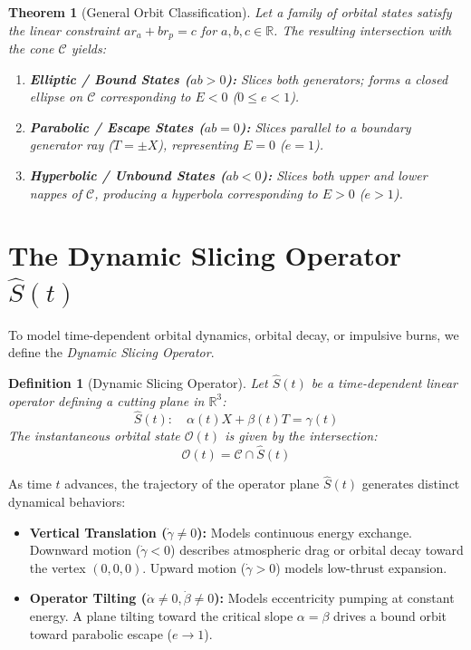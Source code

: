 \documentclass[11pt,3p,twocolumn]{elsarticle}
\newtheorem{theorem}{Theorem}
\newtheorem{definition}{Definition}
\begin{document}
\begin{theorem}[General Orbit Classification]
Let a family of orbital states satisfy the linear constraint $a r_a + b r_p = c$ for $a, b, c \in \mathbb{R}$. The resulting intersection with the cone $\mathcal{C}$ yields:
\begin{enumerate}
    \item \textbf{Elliptic / Bound States ($ab > 0$):} Slices both generators; forms a closed ellipse on $\mathcal{C}$ corresponding to $E < 0$ ($0 \le e < 1$).
    \item \textbf{Parabolic / Escape States ($ab = 0$):} Slices parallel to a boundary generator ray ($T = \pm X$), representing $E = 0$ ($e = 1$).
    \item \textbf{Hyperbolic / Unbound States ($ab < 0$):} Slices both upper and lower nappes of $\mathcal{C}$, producing a hyperbola corresponding to $E > 0$ ($e > 1$).
\end{enumerate}
\end{theorem}

\section{The Dynamic Slicing Operator $\hat{S}(t)$}

To model time-dependent orbital dynamics, orbital decay, or impulsive burns, we define the \emph{Dynamic Slicing Operator}.

\begin{definition}[Dynamic Slicing Operator]
Let $\hat{S}(t)$ be a time-dependent linear operator defining a cutting plane in $\mathbb{R}^3$:
\begin{equation}
\hat{S}(t): \quad \alpha(t) X + \beta(t) T = \gamma(t)
\end{equation}
The instantaneous orbital state $\mathcal{O}(t)$ is given by the intersection:
\begin{equation}
\mathcal{O}(t) = \mathcal{C} \cap \hat{S}(t)
\end{equation}
\end{definition}

As time $t$ advances, the trajectory of the operator plane $\hat{S}(t)$ generates distinct dynamical behaviors:
\begin{itemize}
    \item \textbf{Vertical Translation ($\dot{\gamma} \neq 0$):} Models continuous energy exchange. Downward motion ($\dot{\gamma} < 0$) describes atmospheric drag or orbital decay toward the vertex $(0,0,0)$. Upward motion ($\dot{\gamma} > 0$) models low-thrust expansion.
    \item \textbf{Operator Tilting ($\dot{\alpha} \neq 0, \dot{\beta} \neq 0$):} Models eccentricity pumping at constant energy. A plane tilting toward the critical slope $\alpha = \beta$ drives a bound orbit toward parabolic escape ($e \to 1$).
\end{itemize}
\end{document}
